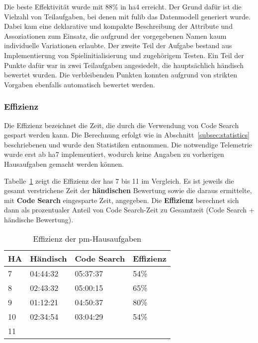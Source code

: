 Die beste Effektivität wurde mit 88\% in \ac{ha}4 erreicht.
Der Grund dafür ist die Vielzahl von Teilaufgaben, bei denen mit fulib das Datenmodell generiert wurde.
Dabei kam eine deklarative und kompakte Beschreibung der Attribute und Assoziationen zum Einsatz, die aufgrund der vorgegebenen Namen kaum individuelle Variationen erlaubte.
Der zweite Teil der Aufgabe bestand aus Implementierung von Spielinitialisierung und zugehörigem Testen.
Ein Teil der Punkte dafür war in zwei Teilaufgaben angesiedelt, die hauptsächlich händisch bewertet wurden.
Die verbleibenden Punkten konnten aufgrund von strikten Vorgaben ebenfalls automatisch bewertet werden.

\subsubsection{Effizienz}

Die Effizienz bezeichnet die Zeit, die durch die Verwendung von Code Search gespart werden kann.
Die Berechnung erfolgt wie in Abschnitt~\ref{subsec:statistics} beschriebenen und wurde den Statistiken entnommen.
Die notwendige Telemetrie wurde erst ab \ac{ha}7 implementiert, wodurch keine Angaben zu vorherigen Hausaufgaben gemacht werden können.

Tabelle~\ref{tbl:pm-efficiency} zeigt die Effizienz der \acp{ha} 7 bis 11 im Vergleich.
Es ist jeweils die gesamt verstrichene Zeit der \textbf{händischen} Bewertung sowie die daraus ermittelte, mit \textbf{Code Search} eingesparte Zeit, angegeben.
Die \textbf{Effizienz} berechnet sich dann als prozentualer Anteil von Code Search-Zeit zu Gesamtzeit (Code Search + händische Bewertung).

\begin{table}
    \centering
    \caption{Effizienz der \ac{pm}-Hausaufgaben}
    \begin{tabular}{|l|l|l|l|}
    \hline
        HA  & Händisch & Code Search & Effizienz \\ \hline
        7   & 04:44:32 & 05:37:37    & 54\%  \\ \hline
        8   & 02:43:32 & 05:00:15    & 65\%  \\ \hline
        9   & 01:12:21 & 04:50:37    & 80\%  \\ \hline
        10  & 02:34:54 & 03:04:29    & 54\%  \\ \hline
        11  & \multicolumn{3}{c}{\todo{}}
    \end{tabular}
    \label{tbl:pm-efficiency}
\end{table}

